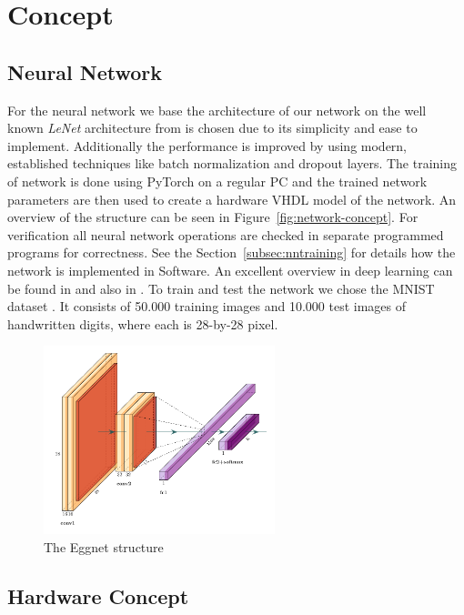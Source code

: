 \section{Concept}

\subsection{Neural Network}

For the neural network we base the architecture of our network on the well known \emph{LeNet} architecture from \cite{LeCun:1998aa} is chosen due to its simplicity and ease to implement. Additionally the performance is improved by using modern, established techniques like batch normalization \cite{Ioffe:2015aa} and dropout \cite{Srivastava:2014aa} layers. 
The training of network is done using PyTorch \cite{Paszke:2019aa} on a regular PC and the trained network parameters are then used to create a hardware VHDL model of the network. An overview of the structure can be seen in Figure~\ref{fig:network-concept}. For verification all neural network operations are checked in separate programmed programs for correctness. See the Section~\ref{subsec:nntraining} for details how the network is implemented in Software.
An excellent overview in deep learning can be found in \cite{Schmidhuber:2015aa} and also in \cite{Goodfellow:2016aa}.
To train and test the network we chose the MNIST dataset \cite{LeCun:1998ab}. It consists of 50.000 training images and 10.000 test images of handwritten digits, where each is 28-by-28 pixel.

\begin{figure}[hbt]
	\centering
	\includegraphics[width=0.6\textwidth]{img/eggnet}
	\caption{The Eggnet structure}
	\label{fig:eggnet}
\end{figure}


\subsection{Hardware Concept}

